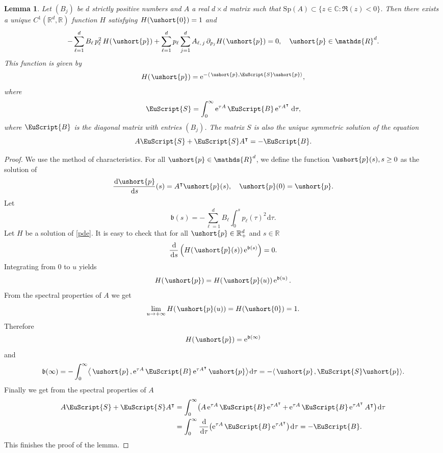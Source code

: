 \documentclass[10pt]{amsart}
\numberwithin{equation}{section}
\theoremstyle{plain}
\newtheorem{lemma}[theorem]{Lemma}
\theoremstyle{definition}
\newcommand{\real}{\mathbb{R}}
\newcommand{\rpd}{\mathbb{R}_+^d}
\newcommand{\Sp}{\mathrm{Sp}}
\newcommand{\vp}{\ushort{p}}
\newcommand{\e}{\operatorname{e}}
\newcommand{\dd}{\hspace{1pt}\mathrm{d}}
\begin{document}
\begin{lemma}\label{uniquesol}
Let $(B_{j})$ be $d$ strictly positive numbers and $A$ a real $d\times
d$ matrix
such that $\Sp(A)\subset\{z\in\mathds{C}: \Re(z)<0\}$. Then
there exists a unique $C^{1}(\mathds{R}^d,\mathds{R})$ function $H$ satisfying
$H(\ushort{0})=1$ and
\begin{equation}
\label{pde}
-\sum_{\ell=1}^{d}B_{\ell}\, p_{\ell}^2\,H(\hspace{1pt}\vp)+\sum_{\ell=1}^{d} p_{\ell}\sum_{j=1}^{d}A_{\ell,\,j}\,\partial_{p_{j}}H(\hspace{1pt}\vp)=0,\quad \vp\in \mathds{R}^d.
\end{equation}
This function is given by
\[
H(\hspace{1pt}\vp)=\e^{-\langle\, \vp,\EuScript{S}\vp \rangle},
\]
where
\[
\EuScript{S}=\int_{0}^{\infty}\e^{\tau A}\EuScript{B}\e^{\tau A^{\intercal}}\dd\tau,
\]
where $\EuScript{B}$ is the diagonal matrix with entries $(B_{j})$.
The matrix $S$ is also the unique symmetric solution of the
equation
\[
A \EuScript{S}+\EuScript{S} A^{\intercal}=-\EuScript{B}.
\]
\end{lemma}
\begin{proof} We use the method of characteristics. For all $\vp\in \mathds{R}^d$, we define the function
$\vp(s), s\geq 0$ as the solution of
\[
\frac{\dd\vp}{\dd s}(s)= A^{\intercal}\vp(s),\quad\vp(0)=\vp.
\]
Let
\[
\mathfrak{b}(s)=-\sum_{\ell=1}^d B_{\ell} \int_{0}^{s} p_{\ell}(\tau)^2\dd\tau.
\]
Let $H$ be a solution of \eqref{pde}. It is easy to check that for all $\vp\in\rpd$ and $s\in\real$
\[
\frac{\dd}{\dd s}\left(H\!\left(\hspace{1pt}\vp(s)\right)\e^{\mathfrak{b}(s)}\right)=0.
\]
Integrating from $0$ to $u$ yields
\[
H(\hspace{1pt}\vp)=H\!\left(\hspace{1pt}\vp(u)\right) \e^{\mathfrak{b}(u)}.
\]
From the spectral properties of $A$ we get
\[
\lim_{u\to+\infty}H\!\left(\hspace{1pt}\vp(u)\right) =H(\ushort{0})=1.
\]
Therefore
\[
H(\hspace{1pt}\vp)=\e^{\mathfrak{b}(\infty)}
\]
and
\[
\mathfrak{b}(\infty)=-\int_{0}^{\infty}\bigl\langle\,\vp\hspace{1pt},\e^{\tau A}\EuScript{B}\e^{\tau A^{\intercal}}\vp\bigr\rangle\dd\tau
=-\langle\, \vp\hspace{1pt},\EuScript{S}\vp\rangle.
\]
Finally we get from the spectral properties of $A$
\begin{align*}
A \EuScript{S}+\EuScript{S} A^{\intercal}
&= \int_{0}^{\infty} \bigl(A\e^{\tau A}\EuScript{B}\e^{\tau A^{\intercal}}+\e^{\tau A}\EuScript{B}\e^{\tau A^{\intercal}} A^{\intercal} \bigr)
\dd\tau\\
&= \int_{0}^{\infty}\frac{\dd}{\dd\tau} \bigl(\e^{\tau A}\EuScript{B}\e^{\tau A^{\intercal}} \bigr)\dd\tau
=-\EuScript{B}.
\end{align*}
This finishes the proof of the lemma.
\end{proof}
\end{document}
